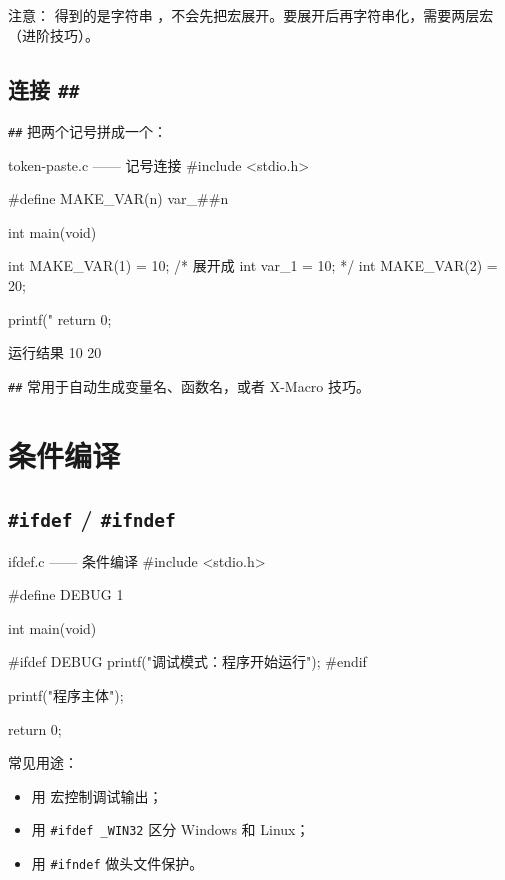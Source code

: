 注意： 得到的是字符串 ，不会先把宏展开。要展开后再字符串化，需要两层宏（进阶技巧）。

\subsection{连接 \texttt{\#\#}}

\texttt{\#\#} 把两个记号拼成一个：

\begin{codebox}{token-paste.c —— 记号连接}
#include <stdio.h>

#define MAKE_VAR(n) var_##n

int main(void)
{
    int MAKE_VAR(1) = 10;       /* 展开成 int var_1 = 10; */
    int MAKE_VAR(2) = 20;

    printf("%
    return 0;
}
\end{codebox}

\begin{outbox}{运行结果}
10 20
\end{outbox}

\texttt{\#\#} 常用于自动生成变量名、函数名，或者 X-Macro 技巧。

\section{条件编译}

\subsection{\texttt{\#ifdef} / \texttt{\#ifndef}}

\begin{codebox}{ifdef.c —— 条件编译}
#include <stdio.h>

#define DEBUG 1

int main(void)
{
#ifdef DEBUG
    printf("调试模式：程序开始运行\n");
#endif

    printf("程序主体\n");

    return 0;
}
\end{codebox}

常见用途：

\begin{itemize}
  \item 用  宏控制调试输出；
  \item 用 \texttt{\#ifdef \_WIN32} 区分 Windows 和 Linux；
  \item 用 \texttt{\#ifndef} 做头文件保护。
\end{itemize}

